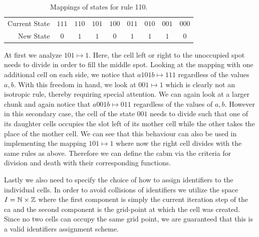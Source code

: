 \begin{table}
    \centering
    \begin{tabular}{ r c c c c c c c c }
        \toprule
        Current State & $111$ & $110$ & $101$ & $100$ & $011$ & $010$ & $001$ & $000$\\
        New State & $0$ & $1$ & $1$ & $0$ & $1$ & $1$ & $1$ & $0$\\
        \bottomrule
    \end{tabular}
    \caption[Mappings of Rule 110]{
        Mappings of states for rule 110.
    }
    \label{tab:rule-110-mappings}
\end{table}

At first we analyze $101\mapsto1$.
Here, the cell left or right to the unoccupied spot needs to divide in order to fill the middle
spot.
Looking at the mapping with one additional cell on each side, we notice that $a101b\mapsto111$
regardless of the values $a,b$.
With this freedom in hand, we look at $001\mapsto1$ which is clearly not an isotropic rule, thereby
requiring special attention.
We can again look at a larger chunk and again notice that $a001b\mapsto011$ regardless of the values
of $a,b$.
However in this secondary case, the cell of the state $001$ needs to divide such that one of its
daughter cells occupies the slot left of its mother cell while the other takes the place of the
mother cell.
We can see that this behaviour can also be used in implementing the mapping $101\mapsto1$ where now
the right cell divides with the same rules as above.
Therefore we can define the \ac{cabm} via the criteria for division and death with their
corresponding functions.

Lastly we also need to specify the choice of how to assign identifiers to the individual cells.
In order to avoid collisions of identifiers we utilize the space $I=\mathbb{N}\times\mathbb{Z}$ where the first
component is simply the current iteration step of the \ac{ca} and the second component is the
grid-point at which the cell was created.
Since no two cells can occupy the same grid point, we are guaranteed that this is a valid
identifiers assignment scheme.

